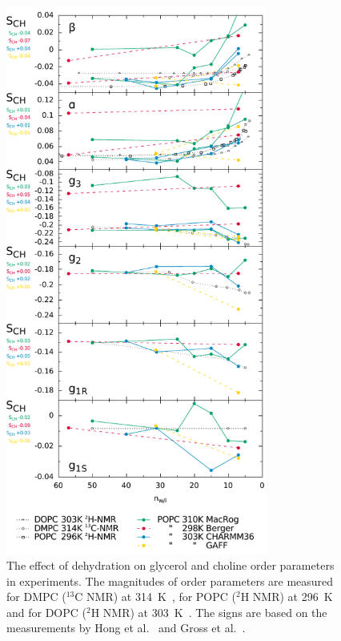 \documentclass[pre,aps,floatfix,authordate1-4,twocolumn]{revtex4-1}
\begin{document}
\begin{figure}[]
  \centering
  \includegraphics[width=8.6cm]{../DATAreportediINblog/dehydration.pdf}
  \caption{\label{ordPhydr}
    The effect of dehydration on glycerol and choline order parameters in experiments.
    The magnitudes of order parameters are measured for DMPC ($^{13}$C NMR) at 314~K~\cite{dvinskikh05b}, 
    for POPC ($^2$H NMR) at 296~K~\cite{bechinger91} and for DOPC ($^2$H NMR) at 303~K~\cite{ulrich94}. 
    The signs are based on the measurements by Hong et al.~\cite{hong95a,hong95b} 
    and Gross et al.~\cite{gross97}.
  }
\end{figure}
\end{document}
